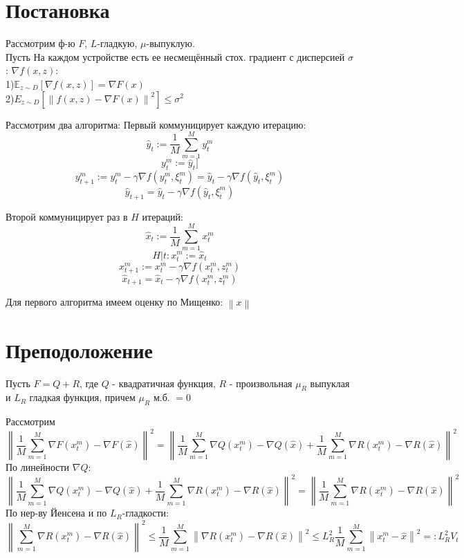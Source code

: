 \documentclass{article}
\theoremstyle{plain}
\newcommand{\norm}[1]{\left\|#1\right\|}
\newcommand{\E}{\mathbb{E}}
\begin{document}
\section{Постановка}
Рассмотрим ф-ю $F$, $L$-гладкую, $\mu$-выпуклую. \\
Пусть На каждом устройстве есть ее несмещённый стох. градиент с дисперсией $\sigma$: $\nabla f(x, z)$:
\\
1)\(\E_{z \sim D}[\nabla f(x, z)] = \nabla F(x)\) \\
2)\(E_{z \sim D}[ \norm{f(x, z) - \nabla F(x)}^2] \leq \sigma^2\)

Рассмотрим два алгоритма:
Первый коммуницирует каждую итерацию:
 \[\hat{y}_t := \frac{1}{M} \sum^M_{m=1} y^m_t\]
 \[y^m_t := \hat{y}_t]\]
 \[y^m_{t+1} := y^m_{t} - \gamma \nabla f(y^m_t, \xi^m_t) = \hat{y}_t - \gamma \nabla f(\hat{y}_t, \xi^m_t)\]
 \begin{equation}\label{eq:y_def}
 \hat{y}_{t+1} = \hat{y}_t - \gamma \nabla f(\hat{y}_t, \xi^m_t)
 \end{equation}

Второй коммуницирует раз в $H$ итераций:
 \[\hat{x}_t := \frac{1}{M} \sum^M_{m=1} x^m_t\]
\[H | t: x^m_t := \hat{x}_t\]
 \[x^m_{t+1} := x^m_{t} - \gamma \nabla f(x^m_t, z^m_t)\]
 \begin{equation}\label{eq:y_def}
 \hat{x}_{t+1} = \hat{x}_t - \gamma \nabla f(x^m_t, z^m_t)
 \end{equation}

Для первого алгоритма имеем оценку по Мищенко:
$\norm{x}$

\section{Преподоложение}
Пусть $F = Q + R$, где $Q$ - квадратичная функция, $R$ - произвольная $\mu_R$ выпуклая и $L_R$ гладкая функция, причем $\mu_R$ м.б. $ = 0$

Рассмотрим \[\norm{\frac{1}{M}\sum^M_{m=1} \nabla F(x^m_t) - \nabla F(\hat{x})}^2 
=
\norm{\frac{1}{M}\sum^M_{m=1} \nabla Q(x^m_t) - \nabla Q(\hat{x}) + \frac{1}{M}\sum^M_{m=1} \nabla R(x^m_t) - \nabla R(\hat{x})}^2
\]
По линейности $\nabla Q$:
\[\norm{\frac{1}{M}\sum^M_{m=1} \nabla Q(x^m_t) - \nabla Q(\hat{x}) + \frac{1}{M}\sum^M_{m=1} \nabla R(x^m_t) - \nabla R(\hat{x})}^2 
=
\norm{\frac{1}{M}\sum^M_{m=1} \nabla R(x^m_t) - \nabla R(\hat{x})}^2
\]
По нер-ву Йенсена и по $L_R$-гладкости:
\[\norm{\sum^M_{m=1} \nabla R(x^m_t) - \nabla R(\hat{x})}^2 
\leq 
\frac{1}{M} \sum^M_{m=1} \norm{\nabla R(x^m_t) - \nabla R(\hat{x})}^2
\leq 
L^2_R \frac{1}{M} \sum^M_{m=1} \norm{x^m_t - \hat{x}}^2 =: L^2_R V_t\]
\end{document}

